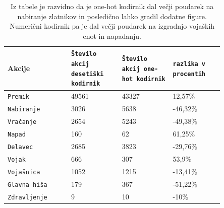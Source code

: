 \documentclass[a4paper, 12pt]{book}
\begin{document}
\begin{table}
	\begin{center}
		\begin{tabular}{p{0.25\linewidth}|p{0.2\linewidth}|p{0.2\linewidth}|p{0.2\linewidth}}
			Akcije             & {\tt Število akcij desetiški kodirnik} & {\tt Število akcij one-hot kodirnik} & {\tt razlika v procentih}\\ \hline
			{\tt Premik}       & 49561                   & 43327                      & 12,57\%                                           \\
			{\tt Nabiranje}    & 3026                    & 5638                       & -46,32\%                                          \\
			{\tt Vračanje}     & 2654                    & 5243                       & -49,38\%                                          \\
			{\tt Napad}        & 160                     & 62                         & 61,25\%                                           \\
			{\tt Delavec}      & 2685                    & 3823                       & -29,76\%                                          \\
			{\tt Vojak}        & 666                     & 307                        &53,9\%                                             \\
			{\tt Vojašnica}    & 1052                    & 1215                       & -13,41\%                                          \\
			{\tt Glavna hiša}  & 179                     & 367                        & -51,22\%                                          \\
			{\tt Zdravljenje}  & 9                       & 10                         & -10\%                                             \\
		\end{tabular}
	\end{center}
	\caption{Iz tabele je razvidno da je one-hot kodirnik dal večji poudarek na nabiranje zlatnikov in posledično lahko gradil dodatne figure.
	Numerični kodirnik pa je dal večji poudarek na izgradnjo vojaških enot in napadanju.}
	\label{tableencoders}
\end{table}

\end{document}
